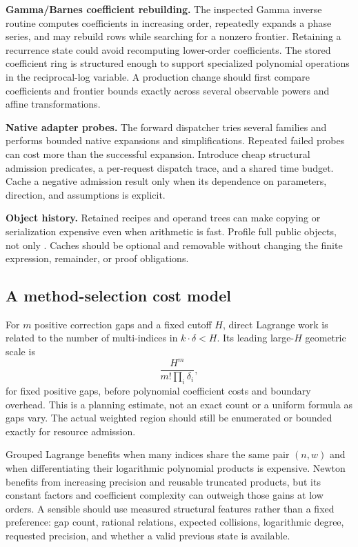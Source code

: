 \documentclass[11pt,a4paper]{article}
\newcommand{\code}[1]{\texttt{\detokenize{#1}}}
\theoremstyle{remark}\newtheorem{remark}[proposition]{Remark}
\begin{document}
\textbf{Gamma/Barnes coefficient rebuilding.} The inspected Gamma inverse routine computes coefficients in increasing order, repeatedly expands a phase series, and may rebuild rows while searching for a nonzero frontier. Retaining a recurrence state could avoid recomputing lower-order coefficients. The stored coefficient ring is structured enough to support specialized polynomial operations in the reciprocal-log variable. A production change should first compare coefficients and frontier bounds exactly across several observable powers and affine transformations.\cite{gamma}

\textbf{Native adapter probes.} The forward dispatcher tries several families and performs bounded native expansions and simplifications. Repeated failed probes can cost more than the successful expansion. Introduce cheap structural admission predicates, a per-request dispatch trace, and a shared time budget. Cache a negative admission result only when its dependence on parameters, direction, and assumptions is explicit.\cite{inverseexpressions,native,sourcecharts}

\textbf{Object history.} Retained recipes and operand trees can make copying or serialization expensive even when arithmetic is fast. Profile full public objects, not only \code{Normal[s]}. Caches should be optional and removable without changing the finite expression, remainder, or proof obligations.

\subsection{A method-selection cost model}
For $m$ positive correction gaps and a fixed cutoff $H$, direct Lagrange work is related to the number of multi-indices in $k\cdot\delta<H$. Its leading large-$H$ geometric scale is
\[
 \frac{H^m}{m!\prod_i\delta_i},
\]
for fixed positive gaps, before polynomial coefficient costs and boundary overhead. This is a planning estimate, not an exact count or a uniform formula as gaps vary. The actual weighted region should still be enumerated or bounded exactly for resource admission.

Grouped Lagrange benefits when many indices share the same pair $(n,w)$ and when differentiating their logarithmic polynomial products is expensive. Newton benefits from increasing precision and reusable truncated products, but its constant factors and coefficient complexity can outweigh those gains at low orders. A sensible \code{Method -> Automatic} should use measured structural features rather than a fixed preference: gap count, rational relations, expected collisions, logarithmic degree, requested precision, and whether a valid previous state is available.
\end{document}
